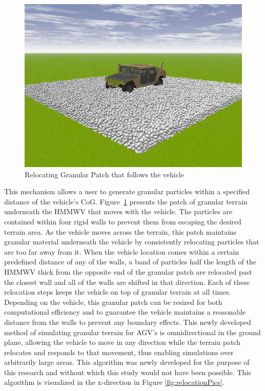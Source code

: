 \documentclass[12pt,onecolumn]{report}
\newcommand{\CHRONO}{{\sffamily{{Chrono}}}}
\begin{document}
\begin{figure}
	\centering
	\includegraphics[width=0.8\columnwidth]{Figs/granPatch.png}
	\caption{\small Relocating Granular Patch that follows the vehicle}  
	\label{fig:granPatch}
\end{figure}

This mechanism allows a user to generate granular particles within a specified distance of the vehicle's CoG. Figure~\ref{fig:granPatch} presents the patch of granular terrain underneath the {\CHRONO}  HMMWV that moves with the vehicle. The particles are contained within four rigid walls to prevent them from escaping the desired terrain area. As the vehicle moves across the terrain, this patch maintains granular material underneath the vehicle by consistently relocating particles that are too far away from it. When the vehicle location comes within a certain predefined distance of any of the walls, a band of particles half the length of the HMMWV thick from the opposite end of the granular patch are relocated past the closest wall and all of the walls are shifted in that direction. Each of these relocation steps keeps the vehicle on top of granular terrain at all times. Depending on the vehicle, this granular patch can be resized for both computational efficiency and to guarantee the vehicle maintains a reasonable distance from the walls to prevent any boundary effects. This newly developed method of simulating granular terrain for AGV's is omnidirectional in the ground plane, allowing the vehicle to move in any direction while the terrain patch relocates and responds to that movement, thus enabling simulations over arbitrarily large areas. This algorithm was newly developed for the purpose of this research and without which this study would not have been possible. This algorithm is visualized in the x-direction in Figure \ref{fig:relocationPics}.
\end{document}
